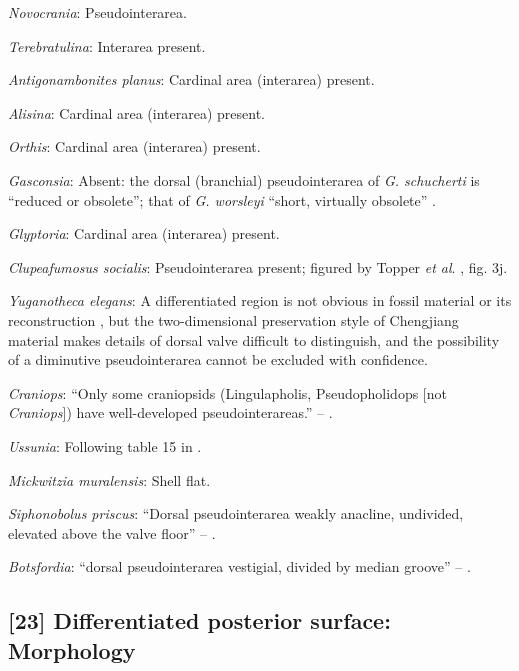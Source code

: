\documentclass[]{book}
\theoremstyle{definition}
\theoremstyle{definition}
\theoremstyle{definition}
\theoremstyle{remark}
\begin{document}
\emph{Novocrania}: Pseudointerarea.

\emph{Terebratulina}: Interarea present.

\emph{Antigonambonites planus}: Cardinal area (interarea) present.

\emph{Alisina}: Cardinal area (interarea) present.

\emph{Orthis}: Cardinal area (interarea) present.

\emph{Gasconsia}: Absent: the dorsal (branchial) pseudointerarea of
\emph{G. schucherti} is ``reduced or obsolete''; that of \emph{G.
worsleyi} ``short, virtually obsolete'' \citep{Hanken1985Thetaxonomy}.

\emph{Glyptoria}: Cardinal area (interarea) present.

\emph{Clupeafumosus socialis}: Pseudointerarea present; figured by
Topper \emph{et al}. \citeyearpar{Topper2013Reappraisalof}, fig. 3j.

\emph{Yuganotheca elegans}: A differentiated region is not obvious in
fossil material or its reconstruction \citep{Zhang2014Anearly}, but the
two-dimensional preservation style of Chengjiang material makes details
of dorsal valve difficult to distinguish, and the possibility of a
diminutive pseudointerarea cannot be excluded with confidence.

\emph{Craniops}: ``Only some craniopsids (Lingulapholis, Pseudopholidops
{[}not \emph{Craniops}{]}) have well-developed pseudointerareas.'' --
\citet{Williams2000BrachiopodaLinguliformea}.

\emph{Ussunia}: Following table 15 in
\citet{Williams2000BrachiopodaLinguliformea}.

\emph{Mickwitzia muralensis}: Shell flat.

\emph{Siphonobolus priscus}: ``Dorsal pseudointerarea weakly anacline,
undivided, elevated above the valve floor'' --
\citet{Popov2009Earlyontogeny}.

\emph{Botsfordia}: ``dorsal pseudointerarea vestigial, divided by median
groove'' -- \citet{Williams2000BrachiopodaLinguliformea}.

\hypertarget{differentiated-posterior-surface-morphology}{%
\subsection*{{[}23{]} Differentiated posterior surface:
Morphology}\label{differentiated-posterior-surface-morphology}}
\end{document}
